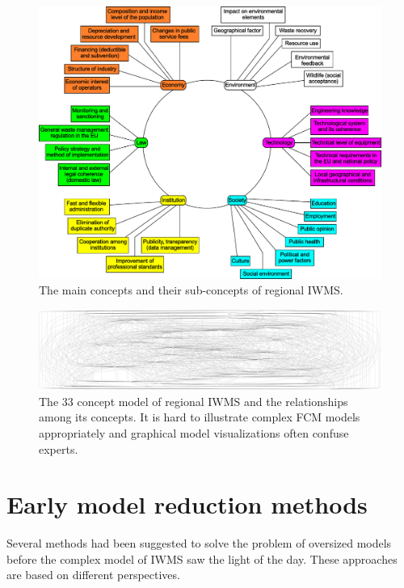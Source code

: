 \documentclass[graybox]{svmult}
\begin{document}
\begin{figure}[hbt]
  \begin{center}
    \includegraphics[width=\textwidth]{szines_virag.pdf}
  \end{center}
  \caption{The main concepts and their sub-concepts of regional IWMS.}
  \label{fig:flower}
\end{figure}

\begin{figure}[hbt]
  \begin{center}
    \includegraphics[width=\textwidth]{fcm_big.pdf}
  \end{center}
  \caption{The 33 concept model of regional IWMS and the relationships among its concepts. It is hard to illustrate complex FCM models appropriately and graphical model visualizations often confuse experts.}
  \label{fig:fcmbig}
\end{figure}

\section{Early model reduction methods}
\label{sec:earlyReduction}

Several methods had been suggested to solve the problem of oversized models before the complex model of IWMS saw the light of the day. These approaches are based on different perspectives.
\end{document}
